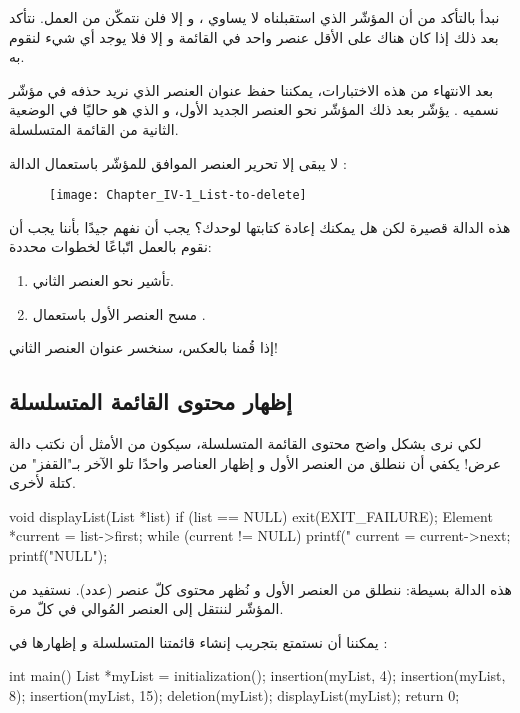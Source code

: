 نبدأ بالتأكد من أن المؤشّر الذي استقبلناه لا يساوي
،
و إلا فلن نتمكّن من العمل. نتأكد بعد ذلك إذا كان هناك على الأقل عنصر واحد في القائمة و إلا فلا يوجد أي شيء لنقوم به.

بعد الانتهاء من هذه الاختبارات، يمكننا حفظ عنوان العنصر الذي نريد حذفه في مؤشّر نسميه
.
يؤشّر بعد ذلك المؤشّر
نحو العنصر الجديد الأول، و الذي هو حاليًا في الوضعية الثانية من القائمة المتسلسلة.

لا يبقى إلا تحرير العنصر الموافق للمؤشّر 
باستعمال الدالة
:

\begin{figure}[H]
	\centering
	\texttt{[image: Chapter\_IV-1\_List-to-delete]}
\end{figure}

هذه الدالة قصيرة لكن هل يمكنك إعادة كتابتها لوحدك؟ يجب أن نفهم جيدًا بأننا يجب أن نقوم بالعمل اتّباعًا لخطوات محددة:

\begin{enumerate}
	\item تأشير
	نحو العنصر الثاني.
	\item مسح العنصر الأول باستعمال 
	.
\end{enumerate}

إذا قُمنا بالعكس، سنخسر عنوان العنصر الثاني!

\subsection{إظهار محتوى القائمة المتسلسلة}

لكي نرى بشكل واضح محتوى القائمة المتسلسلة، سيكون من الأمثل أن نكتب دالة عرض! يكفي أن ننطلق من العنصر الأول و إظهار العناصر واحدًا تلو الآخر بـ"القفز" من كتلة لأخرى.

\begin{Csource}
void displayList(List *list)
{
	if (list == NULL)
	{
		exit(EXIT_FAILURE);
	}
	Element *current = list->first;
	while (current != NULL)
	{
		printf("%
		current = current->next;
	}
	printf("NULL\n");
}
\end{Csource}

هذه الدالة بسيطة: ننطلق من العنصر الأول و نُظهر محتوى كلّ عنصر (عدد). نستفيد من المؤشّر 
لننتقل إلى العنصر المُوالي في كلّ مرة.

يمكننا أن نستمتع بتجريب إنشاء قائمتنا المتسلسلة و إظهارها في :

\begin{Csource}
int main()
{
	List *myList = initialization();
	insertion(myList, 4);
	insertion(myList, 8);
	insertion(myList, 15);
	deletion(myList);
	displayList(myList);
	return 0;
}
\end{Csource}

